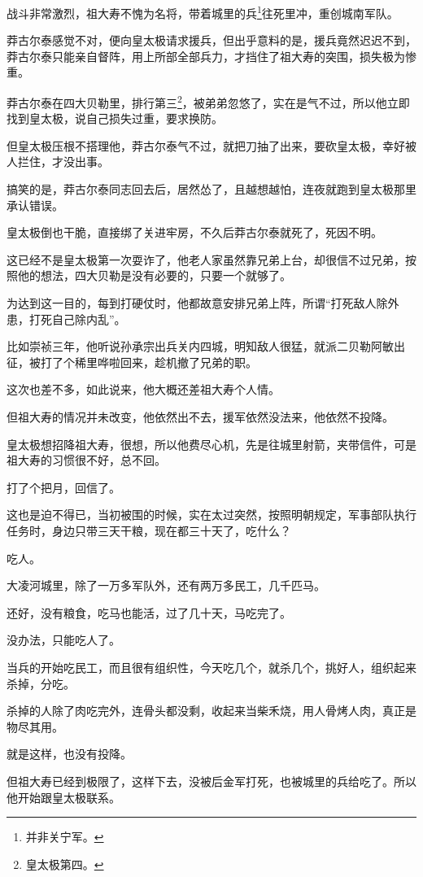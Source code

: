 \begin{multicols}{\theparacolNo}
		战斗非常激烈，祖大寿不愧为名将，带着城里的兵\footnote{并非关宁军。}往死里冲，重创城南军队。

		莽古尔泰感觉不对，便向皇太极请求援兵，但出乎意料的是，援兵竟然迟迟不到，莽古尔泰只能亲自督阵，用上所部全部兵力，才挡住了祖大寿的突围，损失极为惨重。

		莽古尔泰在四大贝勒里，排行第三\footnote{皇太极第四。}，被弟弟忽悠了，实在是气不过，所以他立即找到皇太极，说自己损失过重，要求换防。

		但皇太极压根不搭理他，莽古尔泰气不过，就把刀抽了出来，要砍皇太极，幸好被人拦住，才没出事。

		搞笑的是，莽古尔泰同志回去后，居然怂了，且越想越怕，连夜就跑到皇太极那里承认错误。

		皇太极倒也干脆，直接绑了关进牢房，不久后莽古尔泰就死了，死因不明。

		这已经不是皇太极第一次耍诈了，他老人家虽然靠兄弟上台，却很信不过兄弟，按照他的想法，四大贝勒是没有必要的，只要一个就够了。

		为达到这一目的，每到打硬仗时，他都故意安排兄弟上阵，所谓“打死敌人除外患，打死自己除内乱”。

		比如崇祯三年，他听说孙承宗出兵关内四城，明知敌人很猛，就派二贝勒阿敏出征，被打了个稀里哗啦回来，趁机撤了兄弟的职。

		这次也差不多，如此说来，他大概还差祖大寿个人情。

		但祖大寿的情况并未改变，他依然出不去，援军依然没法来，他依然不投降。

		皇太极想招降祖大寿，很想，所以他费尽心机，先是往城里射箭，夹带信件，可是祖大寿的习惯很不好，总不回。

		打了个把月，回信了。

		这也是迫不得已，当初被围的时候，实在太过突然，按照明朝规定，军事部队执行任务时，身边只带三天干粮，现在都三十天了，吃什么？

		吃人。

		大凌河城里，除了一万多军队外，还有两万多民工，几千匹马。

		还好，没有粮食，吃马也能活，过了几十天，马吃完了。

		没办法，只能吃人了。

		当兵的开始吃民工，而且很有组织性，今天吃几个，就杀几个，挑好人，组织起来杀掉，分吃。

		杀掉的人除了肉吃完外，连骨头都没剩，收起来当柴禾烧，用人骨烤人肉，真正是物尽其用。

		就是这样，也没有投降。

		但祖大寿已经到极限了，这样下去，没被后金军打死，也被城里的兵给吃了。所以他开始跟皇太极联系。


\end{multicols}
